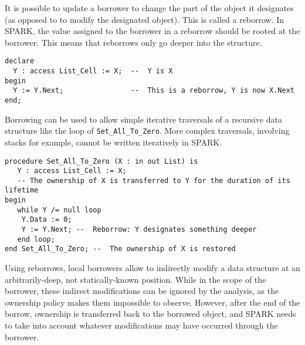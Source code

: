 \documentclass[runningheads]{llncs}
\begin{document}
It is possible to update a borrower to change the part of the object it designates (as opposed to to modify the designated object). This is called a reborrow. In SPARK, the value assigned to the borrower in a reborrow should be rooted at the borrower. This means that reborrows only go deeper into the structure.
\begin{lstlisting}
declare
  Y : access List_Cell := X;  --  Y is X
begin
  Y := Y.Next;                --  This is a reborrow, Y is now X.Next
end;
\end{lstlisting}
Borrowing can be used to allow simple iterative traversals of a recursive data structure like the loop of \texttt{Set\_All\_To\_Zero}. More complex traversals, involving stacks for example, cannot be written iteratively in SPARK.
\begin{lstlisting}
procedure Set_All_To_Zero (X : in out List) is
   Y : access List_Cell := X;  
   -- The ownership of X is transferred to Y for the duration of its lifetime
begin
   while Y /= null loop
  	Y.Data := 0;
  	Y := Y.Next; --  Reborrow: Y designates something deeper
   end loop;
end Set_All_To_Zero; --  The ownership of X is restored
\end{lstlisting}
Using reborrows, local borrowers allow to indirectly modify a data structure at an arbitrarily-deep, not statically-known position. While in the scope of the borrower, these indirect modifications can be ignored by the analysis, as the ownership policy makes them impossible to observe. However, after the end of the borrow, ownership is transferred back to the borrowed object, and SPARK needs to take into account whatever modifications may have occurred through the borrower.
\end{document}
